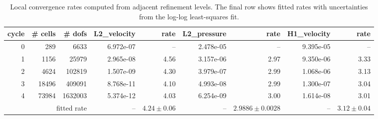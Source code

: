 \begin{table}[htbp]
\centering
\begin{tabular}{|r|r|r|r|r|r|r|r|r|}
\hline
cycle & \# cells & \# dofs & L2\_velocity & rate & L2\_pressure & rate & H1\_velocity & rate \\ \hline
0 & 289 & 6633 & 6.972e-07 & -- & 2.478e-05 & -- & 9.395e-05 & -- \\ \hline
1 & 1156 & 25979 & 2.965e-08 & 4.56 & 3.157e-06 & 2.97 & 9.350e-06 & 3.33 \\ \hline
2 & 4624 & 102819 & 1.507e-09 & 4.30 & 3.979e-07 & 2.99 & 1.068e-06 & 3.13 \\ \hline
3 & 18496 & 409091 & 8.768e-11 & 4.10 & 4.993e-08 & 2.99 & 1.300e-07 & 3.04 \\ \hline
4 & 73984 & 1632003 & 5.374e-12 & 4.03 & 6.254e-09 & 3.00 & 1.614e-08 & 3.01 \\ \hline
\multicolumn{3}{|r|}{fitted rate} & -- & $4.24 \pm 0.06$ & -- & $2.9886 \pm 0.0028$ & -- & $3.12 \pm 0.04$ \\ \hline
\end{tabular}
\caption{Local convergence rates computed from adjacent refinement levels. The final row shows fitted rates with uncertainties from the log-log least-squares fit.}
\end{table}
